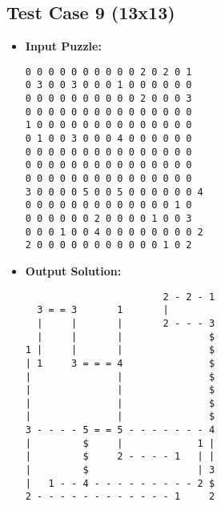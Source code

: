 \subsection{Test Case 9 (13x13)}
\begin{itemize}
    \item \textbf{Input Puzzle:}
    \begin{verbatim}
0 0 0 0 0 0 0 0 0 0 2 0 2 0 1
0 3 0 0 3 0 0 0 1 0 0 0 0 0 0
0 0 0 0 0 0 0 0 0 0 2 0 0 0 3
0 0 0 0 0 0 0 0 0 0 0 0 0 0 0
1 0 0 0 0 0 0 0 0 0 0 0 0 0 0
0 1 0 0 3 0 0 0 4 0 0 0 0 0 0
0 0 0 0 0 0 0 0 0 0 0 0 0 0 0
0 0 0 0 0 0 0 0 0 0 0 0 0 0 0
0 0 0 0 0 0 0 0 0 0 0 0 0 0 0
3 0 0 0 0 5 0 0 5 0 0 0 0 0 0 4
0 0 0 0 0 0 0 0 0 0 0 0 0 1 0
0 0 0 0 0 0 2 0 0 0 0 1 0 0 3
0 0 0 1 0 0 4 0 0 0 0 0 0 0 0 2
2 0 0 0 0 0 0 0 0 0 0 0 1 0 2
    \end{verbatim}
    \item \textbf{Output Solution:}
    \begin{verbatim}
                        2 - 2 - 1
  3 = = 3       1       |        
  |     |       |       2 - - - 3
  |     |       |               $
1 |     |       |               $
| 1     3 = = = 4               $
|               |               $
|               |               $
|               |               $
|               |               $
3 - - - - 5 = = 5 - - - - - - - 4
|         $     |             1 |
|         $     2 - - - - 1   | |
|         $                   | 3
|   1 - - 4 - - - - - - - - - 2 $
2 - - - - - - - - - - - - 1     2
    \end{verbatim}
\end{itemize}

